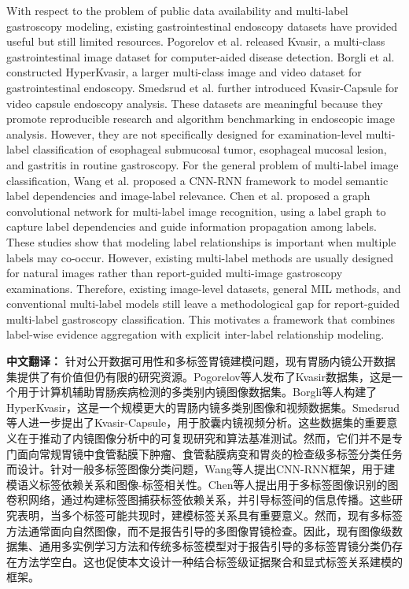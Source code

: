 \documentclass[Afour,sagev,times]{sagej}
\begin{document}
With respect to the problem of public data availability and multi-label gastroscopy modeling, existing gastrointestinal endoscopy datasets have provided useful but still limited resources. Pogorelov et al. released Kvasir, a multi-class gastrointestinal image dataset for computer-aided disease detection. Borgli et al. constructed HyperKvasir, a larger multi-class image and video dataset for gastrointestinal endoscopy. Smedsrud et al. further introduced Kvasir-Capsule for video capsule endoscopy analysis. These datasets are meaningful because they promote reproducible research and algorithm benchmarking in endoscopic image analysis. However, they are not specifically designed for examination-level multi-label classification of esophageal submucosal tumor, esophageal mucosal lesion, and gastritis in routine gastroscopy. For the general problem of multi-label image classification, Wang et al. proposed a CNN-RNN framework to model semantic label dependencies and image-label relevance.\cite{R14} Chen et al. proposed a graph convolutional network for multi-label image recognition, using a label graph to capture label dependencies and guide information propagation among labels.\cite{R15} These studies show that modeling label relationships is important when multiple labels may co-occur. However, existing multi-label methods are usually designed for natural images rather than report-guided multi-image gastroscopy examinations. Therefore, existing image-level datasets, general MIL methods, and conventional multi-label models still leave a methodological gap for report-guided multi-label gastroscopy classification. This motivates a framework that combines label-wise evidence aggregation with explicit inter-label relationship modeling.

\textbf{中文翻译：} 针对公开数据可用性和多标签胃镜建模问题，现有胃肠内镜公开数据集提供了有价值但仍有限的研究资源。Pogorelov等人发布了Kvasir数据集，这是一个用于计算机辅助胃肠疾病检测的多类别内镜图像数据集。Borgli等人构建了HyperKvasir，这是一个规模更大的胃肠内镜多类别图像和视频数据集。Smedsrud等人进一步提出了Kvasir-Capsule，用于胶囊内镜视频分析。这些数据集的重要意义在于推动了内镜图像分析中的可复现研究和算法基准测试。然而，它们并不是专门面向常规胃镜中食管黏膜下肿瘤、食管黏膜病变和胃炎的检查级多标签分类任务而设计。针对一般多标签图像分类问题，Wang等人提出CNN-RNN框架，用于建模语义标签依赖关系和图像-标签相关性。Chen等人提出用于多标签图像识别的图卷积网络，通过构建标签图捕获标签依赖关系，并引导标签间的信息传播。这些研究表明，当多个标签可能共现时，建模标签关系具有重要意义。然而，现有多标签方法通常面向自然图像，而不是报告引导的多图像胃镜检查。因此，现有图像级数据集、通用多实例学习方法和传统多标签模型对于报告引导的多标签胃镜分类仍存在方法学空白。这也促使本文设计一种结合标签级证据聚合和显式标签关系建模的框架。
\end{document}
